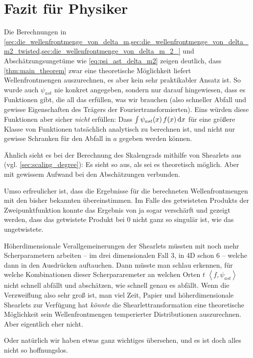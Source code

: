 
\section{Fazit für Physiker} %
\label{sec:fazit_fuer_physiker}

Die Berechnungen in \cref{sec:die_wellenfrontmenge_von_delta_m,sec:die_wellenfrontmenge_von_delta_m2_twisted,sec:die_wellenfrontmenge_von_delta_m_2_} und Abschätzungsungetüme wie \cref{eq:psi_ast_delta_m2} zeigen deutlich, dass \cref{thm:main_theorem} zwar eine theoretische Möglichkeit liefert Wellenfrontmengen auszurechnen, es aber kein sehr praktikabler Ansatz ist. So wurde auch $\psi_{ast}$ nie konkret angegeben, sondern nur darauf hingewiesen, dass es Funktionen gibt, die all das erfüllen, was wir brauchen (also schneller Abfall und gewisse Eigenschaften des Trägers der Fouriertransformierten). Eins würden diese Funktionen aber sicher \emph{nicht} erfüllen: Dass $\int \psi_{ast}(x)\,f(x) \mathop{}\!\mathrm{d} x$ für eine größere Klasse von Funktionen tatsächlich analytisch zu berechnen ist, und nicht nur gewisse Schranken für den Abfall in $a$ gegeben werden können.

Ähnlich sieht es bei der Berechnung des Skalengrads mithilfe von Shearlets aus (vgl. \cref{sec:scaling_degree}): Es sieht so aus, als sei es theoretisch möglich. Aber mit gewissem Aufwand bei den Abschätzungen verbunden.

Umso erfreulicher ist, dass die Ergebnisse für die berechneten Wellenfrontmengen mit den bisher bekannten übereinstimmen. Im Falle des getwisteten Produkts der Zweipunktfunktion konnte das Ergebnis von \textcite{Schulz2014} ja sogar verschärft und gezeigt werden, dass das getwistete Produkt bei $0$ nicht ganz so singulär ist, wie das ungetwistete.

Höherdimensionale Verallgemeinerungen der Shearlets müssten mit noch mehr Scherparametern arbeiten -- im drei dimensionalen Fall 3, in 4D schon  6 -- welche dann in den Ausdrücken auftauchen. Dann müsste man schlau erkennen, für welche Kombinationen dieser Scherpararemeter an welchen Orten $t$ $\left< f, \psi_{ast} \right>$ nicht schnell abfällt und abschätzen, wie schnell genau es abfällt.
Wenn die Verzweiflung also sehr groß ist, man viel Zeit, Papier und höherdimensionale Shearlets zur Verfügung hat \emph{könnte} die Shearlettransformation eine theoretische Möglichkeit sein Wellenfrontmengen temperierter Distributionen auszurechnen. Aber eigentlich eher nicht.

Oder natürlich wir haben etwas ganz wichtiges übersehen, und es ist doch alles nicht so hoffnungslos.

